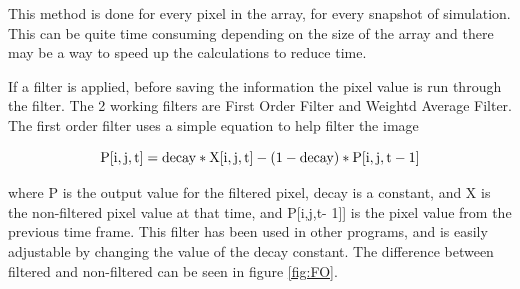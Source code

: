 \documentclass[12pt]{article} %
\begin{document}
This method is done for every pixel in the array, for every snapshot of simulation. This can be quite time consuming depending on the size of the array and there may be a way to speed up the calculations to reduce time. 

If a filter is applied, before saving the information the pixel value is run through the filter.  The 2 working filters are First Order Filter and Weightd Average Filter. The first order filter uses a simple equation to help filter the image

\begin{equation}
\rm{P[i,j,t]} = \rm{decay*X[i,j,t]} - (1-\rm{decay})*P[i,j,t-1]
\end{equation}

where P is the output value for the filtered pixel, decay is a constant, and X is the non-filtered pixel value at that time, and P[i,j,t-	1]] is the pixel value from the previous time frame. This filter has been used in other programs, and is easily adjustable by changing the value of the decay constant. The difference between filtered and non-filtered can be seen in figure \ref{fig:FO}.
\end{document}
